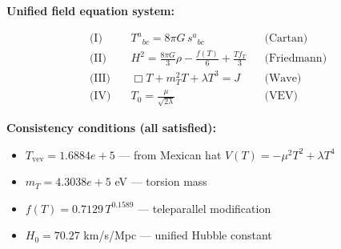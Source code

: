 
\textbf{Unified field equation system:}

\begin{align}
  \text{(I)} \quad & T^a{}_{bc} = 8\pi G \, s^a{}_{bc} && \text{(Cartan)} \\
  \text{(II)} \quad & H^2 = \frac{8\pi G}{3}\rho - \frac{f(T)}{6} + \frac{Tf_T}{3} && \text{(Friedmann)} \\
  \text{(III)} \quad & \Box T + m_T^2 T + \lambda T^3 = J && \text{(Wave)} \\
  \text{(IV)} \quad & T_0 = \frac{\mu}{\sqrt{2\lambda}} && \text{(VEV)}
\end{align}

\textbf{Consistency conditions (all satisfied):}
\begin{itemize}
  \item $T_{\text{vev}} = 1.6884e+5$ — from Mexican hat $V(T) = -\mu^2 T^2 + \lambda T^4$
  \item $m_T = 4.3038e+5$ eV — torsion mass
  \item $f(T) = 0.7129 \, T^{0.1589}$ — teleparallel modification
  \item $H_0 = 70.27$ km/s/Mpc — unified Hubble constant
\end{itemize}